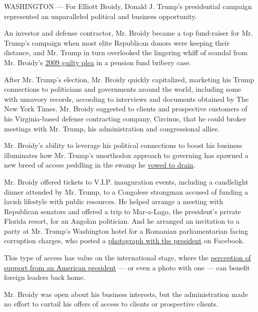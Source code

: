 WASHINGTON --- For Elliott Broidy, Donald J. Trump's presidential
campaign represented an unparalleled political and business opportunity.

An investor and defense contractor, Mr. Broidy became a top fund-raiser
for Mr. Trump's campaign when most elite Republican donors were keeping
their distance, and Mr. Trump in turn overlooked the lingering whiff of
scandal from Mr. Broidy's
\href{https://dealbook.nytimes.com/2009/12/03/guilty-plea-in-new-york-pension-bribery-case/}{2009
guilty plea} in a pension fund bribery case.

After Mr. Trump's election, Mr. Broidy quickly capitalized, marketing
his Trump connections to politicians and governments around the world,
including some with unsavory records, according to interviews and
documents obtained by The New York Times. Mr. Broidy suggested to
clients and prospective customers of his Virginia-based defense
contracting company, Circinus, that he could broker meetings with Mr.
Trump, his administration and congressional allies.

Mr. Broidy's ability to leverage his political connections to boost his
business illuminates how Mr. Trump's unorthodox approach to governing
has spawned a new breed of access peddling in the swamp he
\href{https://www.nytimes.com/2016/11/11/us/politics/trump-government.html}{vowed
to drain}.

Mr. Broidy offered tickets to V.I.P. inauguration events, including a
candlelight dinner attended by Mr. Trump, to a Congolese strongman
accused of funding a lavish lifestyle with public resources. He helped
arrange a meeting with Republican senators and offered a trip to
Mar-a-Lago, the president's private Florida resort, for an Angolan
politician. And he arranged an invitation to a party at Mr. Trump's
Washington hotel for a Romanian parliamentarian facing corruption
charges, who posted a
\href{https://www.facebook.com/liviudragnea.ro/posts/1277208735691204}{photograph
with the president} on Facebook.

This type of access has value on the international stage, where the
\href{https://www.politico.com/story/2017/02/trump-ukraine-russia-sanctions-234631}{perception
of support from an American president} --- or even a photo with one ---
can benefit foreign leaders back home.

Mr. Broidy was open about his business interests, but the administration
made no effort to curtail his offers of access to clients or prospective
clients.

